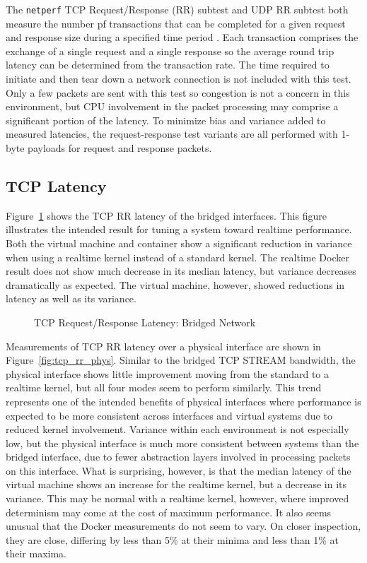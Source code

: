 The \texttt{netperf} TCP Request/Response (RR) subtest and UDP RR subtest both measure the number pf transactions that can be completed for a given request and response size during a specified time period \autocite{netperfTraining}.
Each transaction comprises the exchange of a single request and a single response so the average round trip latency can be determined from the transaction rate.  
The time required to initiate and then tear down a network connection is not included with this test.  
Only a few packets are sent with this test so congestion is not a concern in this environment, but CPU involvement in the packet processing may comprise a significant portion of the latency.  
To minimize bias and variance added to measured latencies, the request-response test variants are all performed with 1-byte payloads for request and response packets.

\subsection{TCP Latency} %
\label{sub:tcplatency}
Figure~\ref{fig:tcp_rr_bridge} shows the TCP RR latency of the bridged interfaces.
This figure illustrates the intended result for tuning a system toward realtime performance.
Both the virtual machine and container show a significant reduction in variance when using a realtime kernel instead of a standard kernel.
The realtime Docker result does not show much decrease in its median latency, but variance decreases dramatically as expected.
The virtual machine, however, showed reductions in latency as well as its variance.

\begin{figure}
    \centering
    \def\svgwidth{\columnwidth}
    
    \caption{TCP Request/Response Latency: Bridged Network}
    \label{fig:tcp_rr_bridge}
\end{figure}

Measurements of TCP RR latency over a physical interface are shown in Figure~\ref{fig:tcp_rr_phys}.  
Similar to the bridged TCP STREAM bandwidth, the physical interface shows little improvement moving from the standard to a realtime kernel, but all four modes seem to perform similarly.
This trend represents one of the intended benefits of physical interfaces where performance is expected to be more consistent across interfaces and virtual systems due to reduced kernel involvement.
Variance within each environment is not especially low, but the physical interface is much more consistent between systems than the bridged interface, due to fewer abstraction layers involved in processing packets on this interface. 
What is surprising, however, is that the median latency of the virtual machine shows an increase for the realtime kernel, but a decrease in its variance.  
This may be normal with a realtime kernel, however, where improved determinism may come at the cost of maximum performance.  
It also seems unusual that the Docker measurements do not seem to vary.  
On closer inspection, they are close, differing by less than 5\% at their minima and less than 1\% at their maxima.

